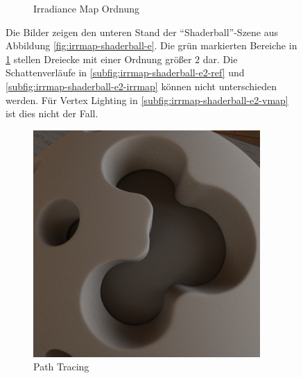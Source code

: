 \begin{figure}[p]
\begin{subfigure}[t]{\textwidth}
				\caption{Irradiance Map Ordnung}
				\label{subfig:irrmap-shaderball-e2-irrmap-order}
			\end{subfigure}
			\caption[Irradiance Map der \enquote{Shaderball}-Szene mit der \enquote{Ennis-Brown House}-HDR]{Die Bilder zeigen den unteren Stand der \enquote{Shaderball}-Szene aus Abbildung \ref{fig:irrmap-shaderball-e}. Die grün markierten Bereiche in \ref{subfig:irrmap-shaderball-e2-irrmap-order} stellen Dreiecke mit einer Ordnung größer $2$ dar. Die Schattenverläufe in \ref{subfig:irrmap-shaderball-e2-ref} und \ref{subfig:irrmap-shaderball-e2-irrmap} können nicht unterschieden werden. Für Vertex Lighting in \ref{subfig:irrmap-shaderball-e2-vmap} ist dies nicht der Fall.}
			\label{fig:irrmap-shaderball-e2}
		\end{figure}

		\begin{figure}[H]
			\begin{subfigure}[t]{0.5\textwidth}
				\center
				\includegraphics[width=0.95\textwidth]{pic/irrmap-shaderball_e3-ref.png}
				\caption{Path Tracing}
				\label{subfig:irrmap-shaderball-e3-ref}
			\end{subfigure}
			\begin{subfigure}[t]{0.5\textwidth}
				\center

\end{subfigure}
\end{figure}
